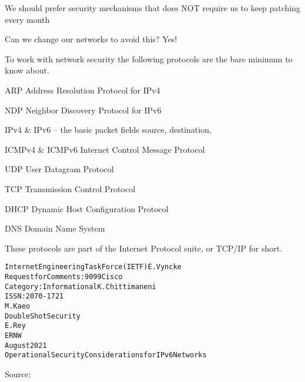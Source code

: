 \documentclass[Screen16to9,17pt]{foils}
\begin{document}



\begin{list2}
\item We should prefer security mechanisms that does NOT require us to keep patching every month
\item Can we change our networks to avoid this? Yes!
\end{list2}


To work with network security the following protocols are the bare minimum to know about.

\begin{list2}
\item ARP Address Resolution Protocol for IPv4
\item NDP Neighbor Discovery Protocol for IPv6
\item IPv4 \& IPv6 -- the basic packet fields source, destination,
\item ICMPv4 \& ICMPv6 Internet Control Message Protocol
\item UDP User Datagram Protocol
\item TCP Transmission Control Protocol
\item DHCP Dynamic Host Configuration Protocol
\item DNS Domain Name System
\end{list2}

These protocols are part of the Internet Protocol suite, or TCP/IP for short.




\begin{alltt}\small
Internet Engineering Task Force (IETF)                         É. Vyncke
Request for Comments: 9099                                         Cisco
Category: Informational                                  K. Chittimaneni
ISSN: 2070-1721
                                                                 M. Kaeo
                                                    Double Shot Security
                                                                  E. Rey
                                                                    ERNW
                                                             August 2021
         Operational Security Considerations for IPv6 Networks
\end{alltt}
Source: 
\end{document}
